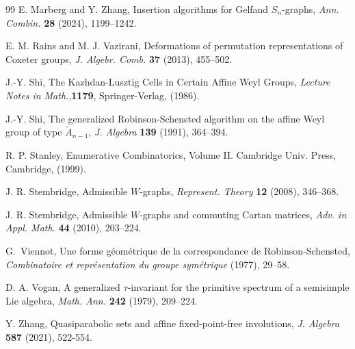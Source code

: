 \documentclass[11pt]{article}
\begin{document}
\begin{thebibliography}{99}
 E. Marberg and Y. Zhang, Insertion algorithms for Gelfand $S_n$-graphs, \emph{Ann. Combin.} \textbf{28} (2024), 1199--1242.


 E. M. Rains and M. J. Vazirani, Deformations of permutation representations of Coxeter groups, \emph{J. Algebr. Comb.} \textbf{37} (2013), 455--502. 

 J.-Y. Shi, The Kazhdan-Lusztig Cells in Certain Affine Weyl Groups, \emph{Lecture Notes in Math.},\textbf{1179}, Springer-Verlag, (1986).

 J.-Y. Shi, The generalized Robinson-Schensted algorithm on the affine Weyl group of type $\tilde{{A}}_{n-1}$, \emph{J. Algebra} \textbf{139} (1991), 364--394.



 R. P. Stanley, Enumerative Combinatorics, Volume II. Cambridge Univ. Press, Cambridge, (1999).

 J. R. Stembridge,  Admissible $W$-graphs, \emph{Represent. Theory} \textbf{12} (2008), 346--368.

 J. R. Stembridge,  Admissible $W$-graphs and commuting Cartan matrices, \emph{Adv. in Appl. Math.} \textbf{44} (2010), 203--224.


 G.~Viennot, Une forme g{\'e}om{\'e}trique de la correspondance de Robinson-Schensted, \emph{Combinatoire et repr{\'e}sentation du groupe sym{\'e}trique} (1977), 29--58.

 D. A. Vogan, A generalized {$\tau$}-invariant for the primitive spectrum of a semisimple Lie algebra, \emph{Math. Ann.} \textbf{242} (1979), 209--224.


 Y. Zhang, Quasiparabolic sets and affine fixed-point-free involutions, \emph{J. Algebra} \textbf{587} (2021), 522-554.


\end{thebibliography}
\end{document}
